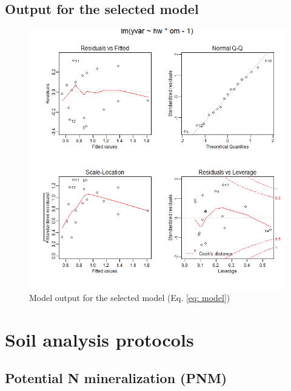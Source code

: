 \documentclass[10pt,twoside,dutch,english]{report}
\begin{document}
\begin{appendices}
\section{Output for the selected model}
	\begin{figure}[ht] %
		\includegraphics[width=1\linewidth]{ap_mod}
		\caption{Model output for the selected model (Eq. \ref{eq: model})}
		\label{fig:ap_mod}
	\end{figure}
	

\chapter{Soil analysis protocols}
		\label{chap: Protocols}
\section{Potential N mineralization (PNM)}

\end{appendices}
\end{document}

